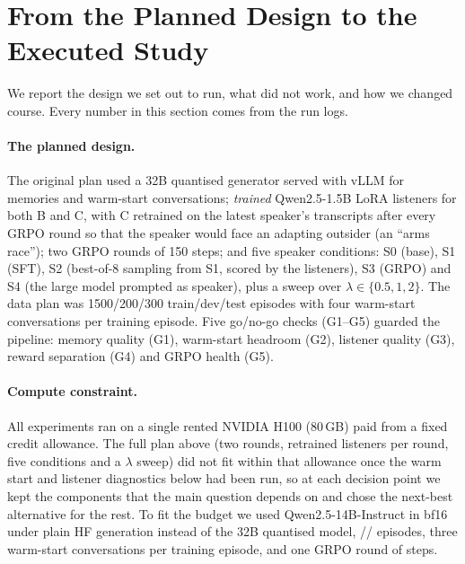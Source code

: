 \section{From the Planned Design to the Executed Study}\label{sec:journey}
We report the design we set out to run, what did not work, and how we changed course. Every number in this section comes from the run logs.

\paragraph{The planned design.} The original plan used a 32B quantised generator served with vLLM for memories and warm-start conversations; \emph{trained} Qwen2.5-1.5B LoRA listeners for both B and C, with C retrained on the latest speaker's transcripts after every GRPO round so that the speaker would face an adapting outsider (an ``arms race''); two GRPO rounds of 150 steps; and five speaker conditions: S0 (base), S1 (SFT), S2 (best-of-8 sampling from S1, scored by the listeners), S3 (GRPO) and S4 (the large model prompted as speaker), plus a sweep over $\lambda\in\{0.5,1,2\}$. The data plan was 1500/200/300 train/dev/test episodes with four warm-start conversations per training episode. Five go/no-go checks (G1--G5) guarded the pipeline: memory quality (G1), warm-start headroom (G2), listener quality (G3), reward separation (G4) and GRPO health (G5).

\paragraph{Compute constraint.} All experiments ran on a single rented NVIDIA H100 (80\,GB) paid from a fixed credit allowance. The full plan above (two rounds, retrained listeners per round, five conditions and a $\lambda$ sweep) did not fit within that allowance once the warm start and listener diagnostics below had been run, so at each decision point we kept the components that the main question depends on and chose the next-best alternative for the rest. To fit the budget we used Qwen2.5-14B-Instruct in bf16 under plain HF generation instead of the 32B quantised model, // episodes, three warm-start conversations per training episode, and one GRPO round of  steps.

